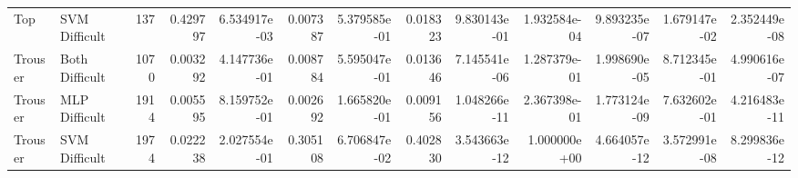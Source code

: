 \begin{tabular}{llrrrrrrrrrrr}
      Top &  SVM Difficult &    137 & 0.429797 & 6.534917e-03 &      0.007387 & 5.379585e-01 &  0.018323 & 9.830143e-01 & 1.932584e-04 &  9.893235e-07 & 1.679147e-02 & 2.352449e-08 \\
  Trouser & Both Difficult &   1070 & 0.003292 & 4.147736e-01 &      0.008784 & 5.595047e-01 &  0.013646 & 7.145541e-06 & 1.287379e-01 &  1.998690e-05 & 8.712345e-01 & 4.990616e-07 \\
  Trouser &  MLP Difficult &   1914 & 0.005595 & 8.159752e-01 &      0.002692 & 1.665820e-01 &  0.009156 & 1.048266e-11 & 2.367398e-01 &  1.773124e-09 & 7.632602e-01 & 4.216483e-11 \\
  Trouser &  SVM Difficult &   1974 & 0.022238 & 2.027554e-01 &      0.305108 & 6.706847e-02 &  0.402830 & 3.543663e-12 & 1.000000e+00 &  4.664057e-12 & 3.572991e-08 & 8.299836e-12 \\
\bottomrule
\end{tabular}
